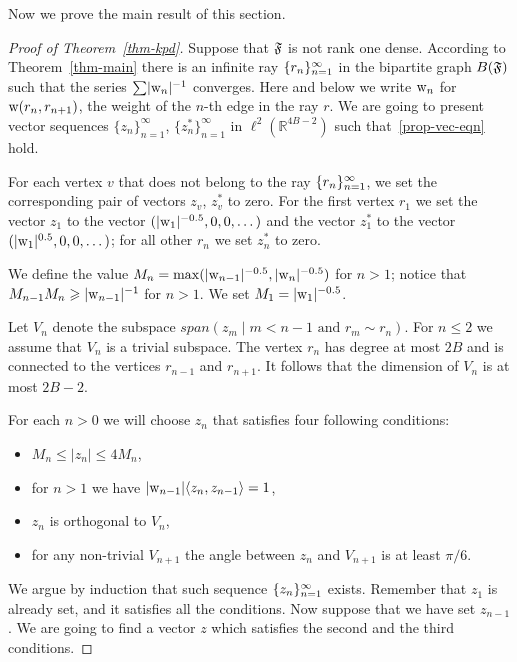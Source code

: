 \documentclass[12pt,oneside,a4paper]{amsart}
\begin{document}
      Now we prove the main result of this section.
      \begin{proof}[Proof of Theorem~\ref{thm-kpd}]
        Suppose that $\mathfrak{F}$ is not rank one dense.
        According to Theorem~\ref{thm-main} there is an infinite ray $\{{r}_n\}_{n=1}^\infty$ in the bipartite
          graph $B(\mathfrak{F})$ such that the series $\sum\lvert\mathrm{w}_n\rvert^{-1}$ converges.
        Here and below we write $\mathrm{w}_n$ for $\mathrm{w}(r_n, r_{n + 1})$, the weight of the $n$-th edge in the ray $r$.
        We are going to present vector sequences $\{z_n\}_{n=1}^\infty$, $\{z^*_n\}_{n=1}^\infty$ in $\ell^2 (\mathbb{R}^{4B-2})$
          such that~\eqref{prop-vec-eqn} hold.

        For each vertex $v$ that does not belong to the ray $\{{r}_n\}_{n=1}^\infty$,
          we set the corresponding pair of vectors $z_v$, $z^*_v$ to zero.
        For the first vertex $r_1$ we set the vector $z_1$ to the vector $(\lvert\mathrm{w}_1\rvert^{-0.5}, 0, 0, \dots)$ and
          the vector $z^*_1$ to the vector $(\lvert\mathrm{w}_1\rvert^{0.5}, 0, 0, \dots)$;
          for all other $r_n$ we set $z^*_n$ to zero.

        We define the value $M_n = \max(\lvert\mathrm{w}_{n-1}\rvert^{-0.5}, \lvert\mathrm{w}_n\rvert^{-0.5})$
          for $n > 1$; notice that $M_{n - 1} M_n \geqslant \lvert\mathrm{w}_{n - 1}\rvert^{-1}$ for $n > 1$.
        We set $M_1 = \lvert\mathrm{w}_1\rvert^{-0.5}$.

        Let $V_n$ denote the subspace $span(z_m \mid m < n - 1 \text{ and } r_m \sim r_n)$.
        For $n \leq 2$ we assume that $V_n$ is a trivial subspace.
        The vertex $r_n$ has degree at most $2B$ and is connected to the vertices $r_{n-1}$ and $r_{n+1}$.
        It follows that the dimension of $V_n$ is at most $2B - 2$.

        For each $n > 0$ we will choose $z_n$ that satisfies four following conditions:
        \begin{itemize}
          \item $M_n \leq \lvert z_n \rvert \leq 4 M_n$,
          \item for $n > 1$ we have $\lvert\mathrm{w}_{n-1}\rvert\langle z_n, z_{n - 1} \rangle = 1$,
          \item $z_n$ is orthogonal to $V_n$,
          \item for any non-trivial $V_{n + 1}$ the angle between $z_n$ and $V_{n + 1}$
              is at least $\pi/6$.
        \end{itemize}

        We argue by induction that such sequence $\{{z}_n\}_{n=1}^\infty$ exists.
        Remember that $z_1$ is already set, and it satisfies all the conditions.
        Now suppose that we have set $z_{n - 1}$.
        We are going to find a vector $z$ which satisfies the second and the third conditions.


\end{proof}
\end{document}
